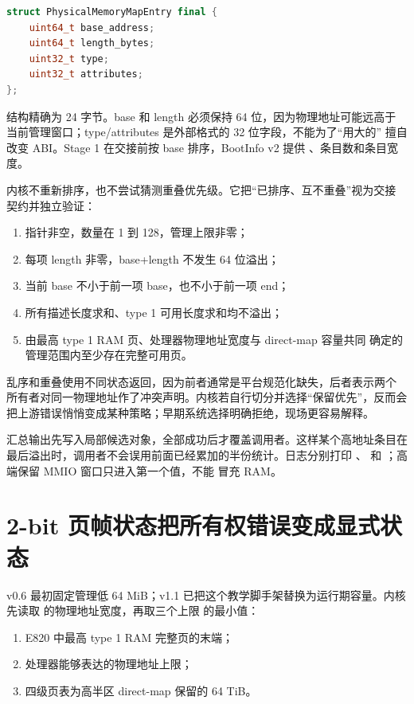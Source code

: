 \begin{lstlisting}[language=C++]
struct PhysicalMemoryMapEntry final {
    uint64_t base_address;
    uint64_t length_bytes;
    uint32_t type;
    uint32_t attributes;
};
\end{lstlisting}

结构精确为 24 字节。base 和 length 必须保持 64 位，因为物理地址可能远高于
当前管理窗口；type/attributes 是外部格式的 32 位字段，不能为了“用大的”
擅自改变 ABI。Stage 1 在交接前按 base 排序，BootInfo v2 提供
、条目数和条目宽度。

内核不重新排序，也不尝试猜测重叠优先级。它把“已排序、互不重叠”视为交接
契约并独立验证：

\begin{enumerate}[label=\arabic*.]
  \item 指针非空，数量在 1 到 128，管理上限非零；
  \item 每项 length 非零，base+length 不发生 64 位溢出；
  \item 当前 base 不小于前一项 base，也不小于前一项 end；
  \item 所有描述长度求和、type 1 可用长度求和均不溢出；
  \item 由最高 type 1 RAM 页、处理器物理地址宽度与 direct-map 容量共同
        确定的管理范围内至少存在完整可用页。
\end{enumerate}

乱序和重叠使用不同状态返回，因为前者通常是平台规范化缺失，后者表示两个
所有者对同一物理地址作了冲突声明。内核若自行切分并选择“保留优先”，反而会
把上游错误悄悄变成某种策略；早期系统选择明确拒绝，现场更容易解释。

汇总输出先写入局部候选对象，全部成功后才覆盖调用者。这样某个高地址条目在
最后溢出时，调用者不会误用前面已经累加的半份统计。日志分别打印
、 和
；高端保留 MMIO 窗口只进入第一个值，不能
冒充 RAM。

\section{2-bit 页帧状态把所有权错误变成显式状态}

v0.6 最初固定管理低 64 MiB；v1.1 已把这个教学脚手架替换为运行期容量。内核
先读取  的物理地址宽度，再取三个上限
的最小值：

\begin{enumerate}[label=\arabic*.]
  \item E820 中最高 type 1 RAM 完整页的末端；
  \item 处理器能够表达的物理地址上限；
  \item 四级页表为高半区 direct-map 保留的 64 TiB。
\end{enumerate}

